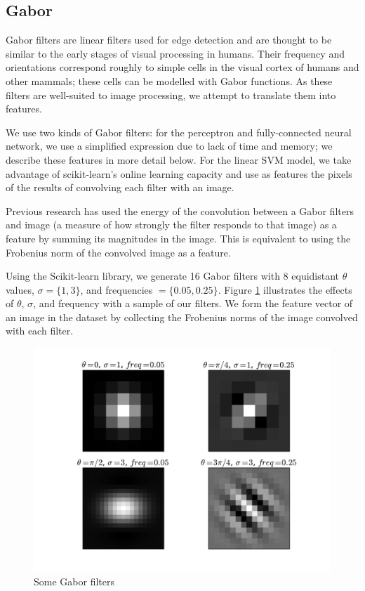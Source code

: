 \documentclass{acm_proc_article-sp}
\begin{document}
\subsection{Gabor}
Gabor filters are linear filters used for edge detection and are thought to be similar to the early stages of visual processing in humans. Their frequency and orientations correspond roughly to simple cells in the visual cortex of humans and other mammals; these cells can be modelled with Gabor functions.\cite{Jones}\cite{Marvcelja} As these filters are well-suited to image processing, we attempt to translate them into features.

We use two kinds of Gabor filters: for the perceptron and fully-connected neural network, we use a simplified expression due to lack of time and memory; we describe these features in more detail below. For the linear SVM model, we take advantage of scikit-learn's online learning capacity and use as features the pixels of the results of convolving each filter with an image.

Previous research has used the energy of the convolution between a Gabor filters and image (a measure of how strongly the filter responds to that image\cite{Grigorescu}) as a feature by summing its magnitudes in the image.\cite{Bau} This is equivalent to using the Frobenius norm of the convolved image as a feature. 

Using the Scikit-learn library\cite{scikit-learn}, we generate 16 Gabor filters with 8 equidistant $\theta$ values, $\sigma = \{1, 3\}$, and frequencies $= \{0.05, 0.25\}$. Figure \ref{fig:gabor} illustrates the effects of $\theta$, $\sigma$, and frequency with a sample of our filters. We form the feature vector of an image in the dataset by collecting the Frobenius norms of the image convolved with each filter. 

\begin{figure}[h]
	\centering
	\includegraphics[width=\linewidth]{gabors}
  	\caption{Some Gabor filters}
  	\label{fig:gabor}
\end{figure}
\end{document}
